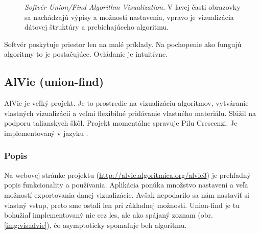 \begin{figure}
\centering
{}
\caption{\emph{Softvér Union/Find Algorithm Visualization.} V ľavej časti 
obrazovky sa nachádzajú výpisy a možnosti nastavenia, vpravo je vizualizácia 
dátovej štruktúry a prebiehajúceho algoritmu.}
\label{img:vis:ufav}
\end{figure}

Softvér poskytuje priestor len na malé príklady. Na 
pochopenie ako fungujú algoritmy to je postačujúce. Ovládanie je intuitívne.

\subsection{AlVie (union-find)}\label{sec:alvie}

AlVie je veľký projekt. Je to prostredie na vizualizáciu algoritmov, 
vytváranie vlastných vizualizácií a veľmi flexibilné pridávanie vlastného 
materiálu. Slúžil na podporu talianskych škôl. Projekt momentálne spravuje 
Pilu Crescenzi. Je implementovaný v jazyku \Java.

\subsubsection{Popis}
Na webovej stránke projektu (\url{http://alvie.algoritmica.org/alvie3}) je 
prehľadný popis funkcionality a používania. Aplikácia ponúka množstvo 
nastavení a veľa možností exportovania danej vizualizácie. Avšak nepodarilo sa 
nám nastaviť si vlastný vstup, preto sme ostali len pri základnej možnosti. 
Union-find je tu bohužiaľ implementovaný nie cez les, ale ako spájaný zoznam 
(obr. \ref{img:vis:alvie}), čo asymptoticky spomaľuje beh algoritmu.

